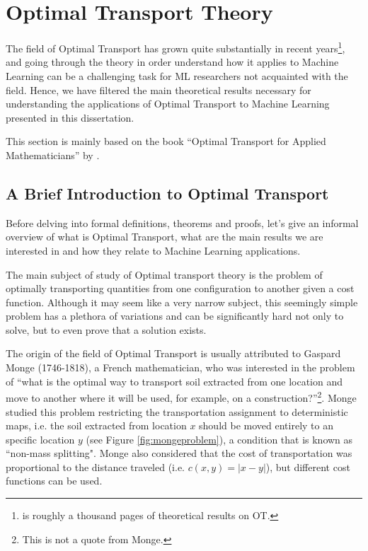 \newpage
\chapter{Optimal Transport Theory}
\label{ch:ottheory}

The field of Optimal Transport has grown quite substantially in recent years\footnote{\citet{villani2008optimal}
is roughly a thousand pages of theoretical results on OT.},
and going through the theory in order understand how it applies to Machine Learning can be a challenging task for
ML researchers not acquainted with the field.
Hence, we have filtered the main theoretical
results necessary for understanding the applications of Optimal Transport to Machine Learning
presented in this dissertation.

This section is mainly based on the book
``Optimal Transport for Applied Mathematicians'' by
\citet{santambrogio2015optimal}.

\section{A Brief Introduction to Optimal Transport}

Before delving into formal definitions, theorems and proofs, let's give an informal overview of what is
Optimal Transport, what are the main results we are interested in and how they relate to Machine Learning applications.

The main subject of study of Optimal transport theory is the problem of optimally transporting
quantities from one configuration to another given a cost function. Although it may seem like a very narrow subject,
this seemingly simple problem has a plethora of variations and can be significantly hard not only to solve,
but to even prove that a solution exists.

The origin of the field of Optimal Transport is usually
attributed to Gaspard Monge (1746-1818), a French mathematician, who was interested in the problem
of ``what is the optimal way to transport soil extracted from one location and move to another where it will be used,
for example, on a construction?''\footnote{This is not a quote from Monge.}\citep{villani2008optimal}.
Monge studied this problem restricting the transportation assignment to deterministic maps, i.e. the soil
extracted from location $x$ should be moved entirely to an specific location $y$ (see Figure \ref{fig:mongeproblem}),
a condition that is known as ``non-mass splitting". Monge also considered that the cost of transportation
was proportional to the distance traveled (i.e. $c(x,y) = |x-y|$), but different cost functions can be used.

